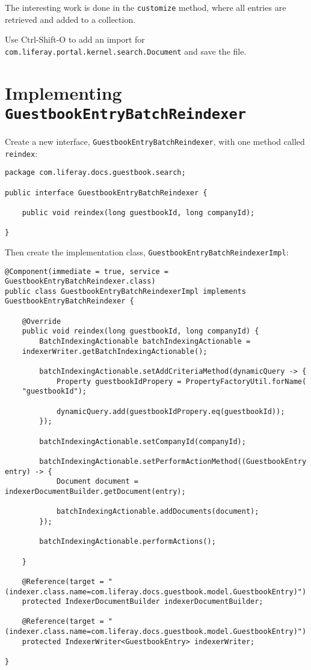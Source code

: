The interesting work is done in the \texttt{customize} method, where all
entries are retrieved and added to a collection.

Use Ctrl-Shift-O to add an import for
\texttt{com.liferay.portal.kernel.search.Document} and save the file.

\section{\texorpdfstring{Implementing
\texttt{GuestbookEntryBatchReindexer}}{Implementing GuestbookEntryBatchReindexer}}\label{implementing-guestbookentrybatchreindexer}

Create a new interface, \texttt{GuestbookEntryBatchReindexer}, with one
method called \texttt{reindex}:

\begin{verbatim}
package com.liferay.docs.guestbook.search;

public interface GuestbookEntryBatchReindexer {

    public void reindex(long guestbookId, long companyId);

}
\end{verbatim}

Then create the implementation class,
\texttt{GuestbookEntryBatchReindexerImpl}:

\begin{verbatim}
@Component(immediate = true, service = GuestbookEntryBatchReindexer.class)
public class GuestbookEntryBatchReindexerImpl implements GuestbookEntryBatchReindexer {

    @Override
    public void reindex(long guestbookId, long companyId) {
        BatchIndexingActionable batchIndexingActionable =
    indexerWriter.getBatchIndexingActionable();

        batchIndexingActionable.setAddCriteriaMethod(dynamicQuery -> {
            Property guestbookIdPropery = PropertyFactoryUtil.forName(
    "guestbookId");

            dynamicQuery.add(guestbookIdPropery.eq(guestbookId));
        });

        batchIndexingActionable.setCompanyId(companyId);

        batchIndexingActionable.setPerformActionMethod((GuestbookEntry entry) -> {
            Document document = indexerDocumentBuilder.getDocument(entry);

            batchIndexingActionable.addDocuments(document);
        });

        batchIndexingActionable.performActions();

    }

    @Reference(target = "(indexer.class.name=com.liferay.docs.guestbook.model.GuestbookEntry)")
    protected IndexerDocumentBuilder indexerDocumentBuilder;

    @Reference(target = "(indexer.class.name=com.liferay.docs.guestbook.model.GuestbookEntry)")
    protected IndexerWriter<GuestbookEntry> indexerWriter;

}
\end{verbatim}

